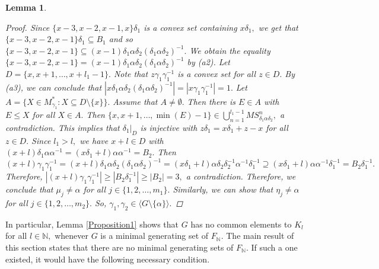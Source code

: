 \documentclass[11pt]{article}
\theoremstyle{plain}
\newtheorem{lemma}[theorem]{Lemma}
\theoremstyle{definition}
\begin{document}
\begin{lemma}
\begin{proof}
Since $\{x-3,x-2,x-1,x\}\delta_{1}$ is a convex set containing $x\delta_{1},$ we get that $\{x-3,x-2,x-1\}\delta_{1}\subseteq B_{1}$ and so $\{x-3,x-2,x-1\}\subseteq (x-1)\delta_{1}\alpha\delta_{2}(\delta_{1}\alpha\delta_{2})^{-1}.$ We obtain the equality $\{x-3,x-2,x-1\}= (x-1)\delta_{1}\alpha\delta_{2}(\delta_{1}\alpha\delta_{2})^{-1}$ by (a2). Let $D=\{x,x+1,\ldots,x+l_{1}-1\}.$ Note that $z\gamma_{1}\gamma_{1}^{-1}$ is a convex set for all $z\in D.$ By (a3), we can conclude that $\left\vert x\delta_{1}\alpha\delta_{2}(\delta_{1}\alpha\delta_{2})^{-1}\right\vert=\left\vert x\gamma_{1}\gamma_{1}^{-1}\right\vert=1.$ Let $A=\{X\in M_{\gamma_{1}}^{*}: X\subseteq D\setminus\{x\}\}.$ Assume that $A\not=\emptyset.$ Then there is $E\in A$ with $E\leq X$ for all $X\in A.$ Then $\{x,x+1,\ldots,\min(E)-1\}\in\bigcup_{n=1}^{l_{1}-1} MS^{n}_{\delta_{1}\alpha\delta_{2}},$ a contradiction. This implies that $\delta_{1}|_{D}$ is injective with $z\delta_{1}=x\delta_{1}+z-x$ for all $z\in D.$ Since $l_{1}>l,$ we have $x+l\in D$ with $(x+l)\delta_{1}\alpha\alpha^{-1}=(x\delta_{1}+l)\alpha\alpha^{-1}=B_{2}.$ Then $(x+l)\gamma_{1}\gamma_{1}^{-1}=(x+l)\delta_{1}\alpha\delta_{2}(\delta_{1}\alpha\delta_{2})^{-1}=(x\delta_{1}+l)\alpha\delta_{2}\delta_{2}^{-1}\alpha^{-1}\delta_{1}^{-1}\supseteq(x\delta_{1}+l)\alpha\alpha^{-1}\delta_{1}^{-1}=B_{2}\delta_{1}^{-1}.$ Therefore, $\left\vert (x+l)\gamma_{1}\gamma_{1}^{-1}\right\vert\geq\left\vert B_{2}\delta_{1}^{-1}\right\vert\geq\left\vert B_{2}\right\vert=3,$ a contradiction. Therefore, we conclude that $\mu_{j}\not=\alpha$ for all $j\in\{1,2,\ldots,m_{1}\}.$ Similarly, we can show that $\eta_{j}\not=\alpha$ for all $j\in\{1,2,\ldots,m_{2}\}.$ So, $\gamma_{1},\gamma_{2}\in\langle G\setminus\{\alpha\}\rangle.$
 \end{proof}
\end{lemma}
In particular, Lemma \ref{Proposition1} shows that $G$ has no common elements to $K_{l}$ for all $l\in\mathbb{N},$ whenever $G$ is a minimal generating set of $F_{\mathbb{N}}.$ The main result of this section states that there are no minimal generating sets of $F_{\mathbb{N}}.$ If such a one existed, it would have the following necessary condition.
\end{document}
